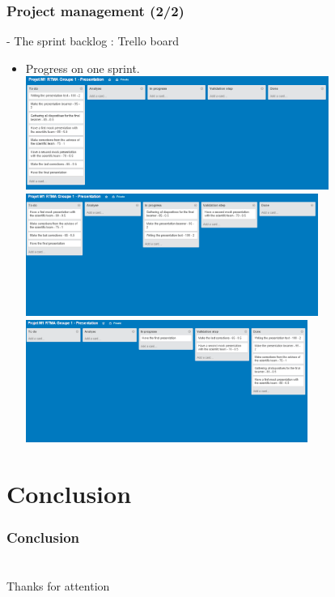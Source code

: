 \documentclass[xcolor=table]{beamer}
\begin{document}
\begin{frame}\frametitle{Project management (2/2)}

- The sprint backlog : Trello board

\begin{itemize}
\item<1-> Progress on one sprint.
 {\includegraphics[height=3.7cm]{trello1.png}} %
 {\includegraphics[height=4cm]{trello2.png}}
 {\includegraphics[height=4cm]{trello3.png}}
\end{itemize}

\end{frame}

\section{Conclusion}
\begin{frame} \frametitle{Conclusion}

\end{frame}


\section{}
\begin{frame} \frametitle{}
    \begin{center}
        Thanks for attention
    \end{center}
\end{frame}
\end{document}
